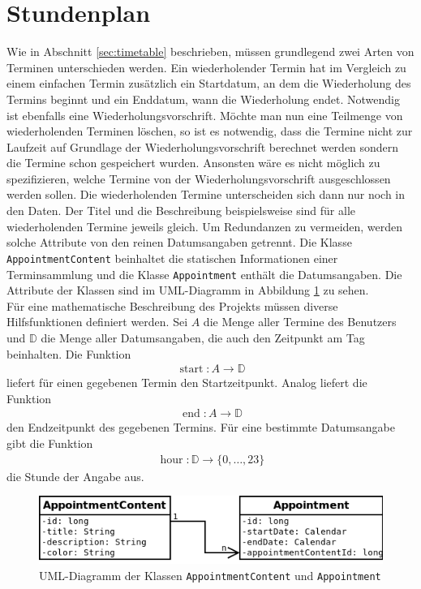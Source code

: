 \documentclass[noindent]{tudreport}
\DeclareMathOperator{\start}{start}
\DeclareMathOperator{\getEnd}{end}
\DeclareMathOperator{\hour}{hour}
\begin{document}
		\section{Stundenplan}
			Wie in Abschnitt \ref{sec:timetable} beschrieben, müssen grundlegend zwei Arten von Terminen unterschieden werden. Ein wiederholender Termin hat im Vergleich zu einem einfachen Termin zusätzlich ein Startdatum, an dem die Wiederholung des Termins beginnt und ein Enddatum, wann die Wiederholung endet. Notwendig ist ebenfalls eine Wiederholungsvorschrift. Möchte man nun eine Teilmenge von wiederholenden Terminen löschen, so ist es notwendig, dass die Termine nicht zur Laufzeit auf Grundlage der Wiederholungsvorschrift berechnet werden sondern die Termine schon gespeichert wurden. Ansonsten wäre es nicht möglich zu spezifizieren, welche Termine von der Wiederholungsvorschrift ausgeschlossen werden sollen. Die wiederholenden Termine unterscheiden sich dann nur noch in den Daten. Der Titel und die Beschreibung beispielsweise sind für alle wiederholenden Termine jeweils gleich. Um Redundanzen zu vermeiden, werden solche Attribute von den reinen Datumsangaben getrennt. Die Klasse \lstinline!AppointmentContent! beinhaltet die statischen Informationen einer Terminsammlung und die Klasse \lstinline!Appointment! enthält die Datumsangaben. Die Attribute der Klassen sind im UML-Diagramm in Abbildung \ref{fig:uml_appointment} zu sehen.\\
			Für eine mathematische Beschreibung des Projekts müssen diverse Hilfsfunktionen definiert werden. Sei $A$ die Menge aller Termine des Benutzers und $\mathbb{D}$ die Menge aller Datumsangaben, die auch den Zeitpunkt am Tag beinhalten. Die Funktion
			\begin{align}
\start: A \rightarrow \mathbb{D} \label{fun:start}
			\end{align}
			liefert für einen gegebenen Termin den Startzeitpunkt. Analog liefert die Funktion
			\begin{align}
\getEnd: A \rightarrow \mathbb{D} \label{fun:end}
			\end{align}
			den Endzeitpunkt des gegebenen Termins. Für eine bestimmte Datumsangabe gibt die Funktion
			\begin{align}
\hour: \mathbb{D} \rightarrow \{0, \dots, 23\} \label{fun:hour}
			\end{align}
			die Stunde der Angabe aus.
			
			\begin{figure}[h]
				\centering
				\includegraphics[scale=0.5]{img/uml_appointment.png}
				\caption{UML-Diagramm der Klassen \lstinline!AppointmentContent! und \lstinline!Appointment!}
				\label{fig:uml_appointment}
			\end{figure}
			
\end{document}
